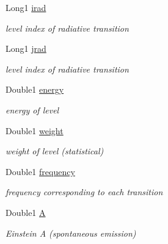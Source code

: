 \begin{DoxyCompactItemize}
\mbox{\label{structLinedata_a38f48360b128abcb7fb6467fa7594591}} 
Long1 \mbox{\hyperlink{structLinedata_a38f48360b128abcb7fb6467fa7594591}{irad}}
\begin{DoxyCompactList}\small\item\em level index of radiative transition \end{DoxyCompactList}\item 
\mbox{\label{structLinedata_af45902e70adadfa03f63449f30f89ea4}} 
Long1 \mbox{\hyperlink{structLinedata_af45902e70adadfa03f63449f30f89ea4}{jrad}}
\begin{DoxyCompactList}\small\item\em level index of radiative transition \end{DoxyCompactList}\item 
\mbox{\label{structLinedata_a7e997b9f5dfcc8de98c490da07eb9c99}} 
Double1 \mbox{\hyperlink{structLinedata_a7e997b9f5dfcc8de98c490da07eb9c99}{energy}}
\begin{DoxyCompactList}\small\item\em energy of level \end{DoxyCompactList}\item 
\mbox{\label{structLinedata_a7a49ab1a4d94bee039b6ae6b3e2b157e}} 
Double1 \mbox{\hyperlink{structLinedata_a7a49ab1a4d94bee039b6ae6b3e2b157e}{weight}}
\begin{DoxyCompactList}\small\item\em weight of level (statistical) \end{DoxyCompactList}\item 
\mbox{\label{structLinedata_ae900dd3f78aa49277a9c26787241607b}} 
Double1 \mbox{\hyperlink{structLinedata_ae900dd3f78aa49277a9c26787241607b}{frequency}}
\begin{DoxyCompactList}\small\item\em frequency corresponding to each transition \end{DoxyCompactList}\item 
\mbox{\label{structLinedata_a3f0e414cf016f18f9a7a86ffbb2207b7}} 
Double1 \mbox{\hyperlink{structLinedata_a3f0e414cf016f18f9a7a86ffbb2207b7}{A}}
\begin{DoxyCompactList}\small\item\em Einstein A (spontaneous emission) \end{DoxyCompactList}\item 

\end{DoxyCompactItemize}
